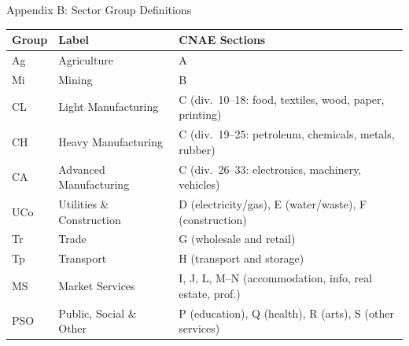 \documentclass[aspectratio=169,11pt]{beamer}
\begin{document}
\begin{frame}{Appendix B: Sector Group Definitions}

\begin{center}
\small
\begin{tabular}{llp{7cm}}
\toprule
\textbf{Group} & \textbf{Label} & \textbf{CNAE Sections} \\
\midrule
Ag  & Agriculture               & A \\
Mi  & Mining                    & B \\
CL  & Light Manufacturing       & C (div.\ 10--18: food, textiles, wood, paper, printing) \\
CH  & Heavy Manufacturing       & C (div.\ 19--25: petroleum, chemicals, metals, rubber) \\
CA  & Advanced Manufacturing    & C (div.\ 26--33: electronics, machinery, vehicles) \\
UCo & Utilities \& Construction & D (electricity/gas), E (water/waste), F (construction) \\
Tr  & Trade                     & G (wholesale and retail) \\
Tp  & Transport                 & H (transport and storage) \\
MS  & Market Services           & I, J, L, M--N (accommodation, info, real estate, prof.) \\
PSO & Public, Social \& Other   & P (education), Q (health), R (arts), S (other services) \\
\bottomrule
\end{tabular}
\end{center}

\end{frame}
\end{document}
